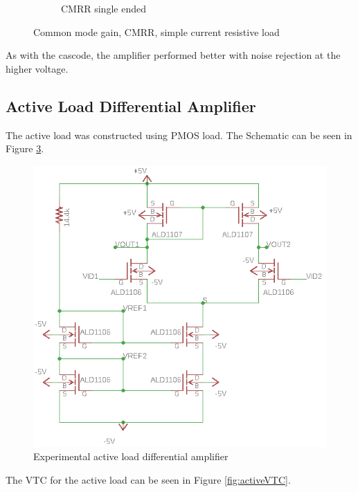 \begin{figure}[H]
\begin{subfigure}[b]{0.45\textwidth}
        \caption{CMRR single ended}
        \label{fig:blue_led}
    \end{subfigure}
    \caption{Common mode gain, CMRR, simple current resistive load}
    \label{fig:CMRR_simple}
\end{figure} 

As with the cascode, the amplifier performed better with noise rejection at the higher voltage.







\subsection{Active Load Differential Amplifier}
The active load was constructed using PMOS load. The Schematic can be seen in Figure \ref{fig:ActiveLoadExp}. 

\begin{figure}[H]
    \begin{center}
    \includegraphics[scale=.85]{ExperimentalImplementation/ActiveLoadedExp.png}
    \caption{Experimental active load differential amplifier}
    \label{fig:ActiveLoadExp}
    \end{center}
\end{figure}

The VTC for the active load can be seen in Figure \ref{fig:activeVTC}.


